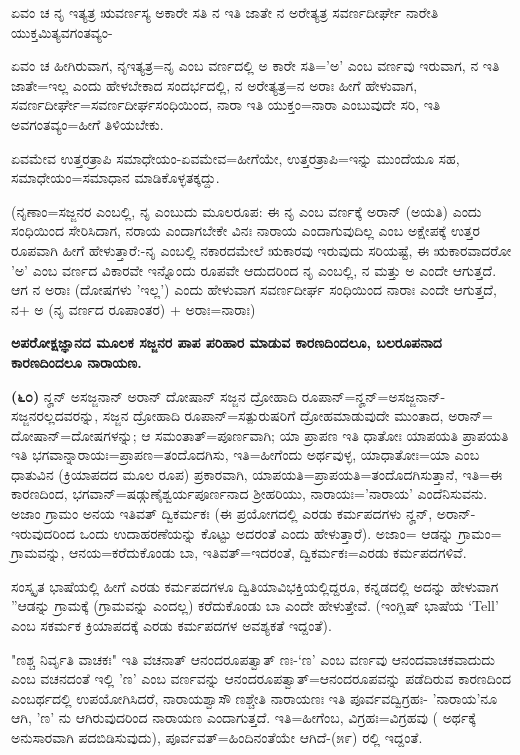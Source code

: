 ಏವಂ ಚ ನೃ ಇತ್ಯತ್ರ ಋವರ್ಣಸ್ಯ ಅಕಾರೇ ಸತಿ ನ ಇತಿ ಜಾತೇ ನ ಅರೇತ್ಯತ್ರ ಸವರ್ಣದೀರ್ಘೇ ನಾರೇತಿ ಯುಕ್ತಮಿತ್ಯವಗಂತವ್ಯಂ-

\newpage

ಏವಂ ಚ ಹೀಗಿರುವಾಗ, ನೃಇತ್ಯತ್ರ=ನೃ ಎಂಬ ವರ್ಣದಲ್ಲಿ ಅ ಕಾರೇ ಸತಿ='ಅ' ಎಂಬ ವರ್ಣವು ಇರುವಾಗ, ನ ಇತಿ ಜಾತೇ=ಇಲ್ಲ ಎಂದು ಹೇಳಬೇಕಾದ ಸಂದರ್ಭದಲ್ಲಿ, ನ ಅರೇತ್ಯತ್ರ=ನ ಅರಾಃ ಹೀಗೆ ಹೇಳುವಾಗ, ಸವರ್ಣದೀರ್ಘೇ=ಸವರ್ಣದೀರ್ಘಸಂಧಿಯಿಂದ, ನಾರಾ ಇತಿ ಯುಕ್ತಂ=ನಾರಾ ಎಂಬುವುದೇ ಸರಿ, ಇತಿ ಅವಗಂತವ್ಯಂ=ಹೀಗೆ ತಿಳಿಯಬೇಕು.

ಏವಮೇವ ಉತ್ತರತ್ರಾಪಿ ಸಮಾಧೇಯಂ-ಏವಮೇವ=ಹೀಗೆಯೇ, ಉತ್ತರತ್ರಾಪಿ=ಇನ್ನು ಮುಂದೆಯೂ ಸಹ, ಸಮಾಧೇಯಂ=ಸಮಾಧಾನ ಮಾಡಿಕೊಳ್ಳತಕ್ಕದ್ದು.

(ನೃಣಾಂ=ಸಜ್ಜನರ ಎಂಬಲ್ಲಿ, ನೃ ಎಂಬುದು ಮೂಲರೂಪ: ಈ ನೃ ಎಂಬ ವರ್ಣಕ್ಕೆ ಅರಾನ್ (ಅಯತಿ) ಎಂದು ಸಂಧಿಯಿಂದ ಸೇರಿಸಿದಾಗ, ನರಾಯ ಎಂದಾಗಬೇಕೇ ವಿನಃ ನಾರಾಯ ಎಂದಾಗುವುದಿಲ್ಲ ಎಂಬ ಅಕ್ಷೇಪಕ್ಕೆ ಉತ್ತರ ರೂಪವಾಗಿ ಹೀಗೆ ಹೇಳುತ್ತಾರೆ:-ನೃ ಎಂಬಲ್ಲಿ ನಕಾರದಮೇಲೆ ಋಕಾರವು ಇರುವುದು ಸರಿಯಷ್ಟೆ, ಈ ಋಕಾರವಾದರೋ 'ಅ' ಎಂಬ ವರ್ಣದ ವಿಕಾರವೇ ಇನ್ನೊಂದು ರೂಪವೇ ಆದುದರಿಂದ ನೃ ಎಂಬಲ್ಲಿ, ನ ಮತ್ತು ಅ ಎಂದೇ ಆಗುತ್ತದೆ. ಆಗ ನ ಅರಾಃ (ದೋಷಗಳು 'ಇಲ್ಲ') ಎಂದು ಹೇಳುವಾಗ ಸವರ್ಣದೀರ್ಘ ಸಂಧಿಯಿಂದ ನಾರಾಃ ಎಂದೇ ಆಗುತ್ತದೆ, ನ+ ಅ (ನೃ ವರ್ಣದ ರೂಪಾಂತರ) + ಅರಾಃ=ನಾರಾಃ)

\begin{center}
\textbf{ಅಪರೋಕ್ಷಜ್ಞಾನದ ಮೂಲಕ ಸಜ್ಜನರ ಪಾಪ ಪರಿಹಾರ ಮಾಡುವ ಕಾರಣದಿಂದಲೂ, ಬಲರೂಪನಾದ ಕಾರಣದಿಂದಲೂ ನಾರಾಯಣ.}
\end{center}

\textbf{(೬೦)} ನೄನ್ ಅಸಜ್ಜನಾನ್ ಅರಾನ್ ದೋಷಾನ್ ಸಜ್ಜನ ದ್ರೋಹಾದಿ ರೂಪಾನ್=ನೄನ್=\-ಅಸಜ್ಜನಾನ್-ಸಜ್ಜನರಲ್ಲದವರನ್ನು, ಸಜ್ಜನ ದ್ರೋಹಾದಿ ರೂಪಾನ್=ಸತ್ಪುರುಷರಿಗೆ ದ್ರೋಹಮಾಡುವುದೇ ಮುಂತಾದ, ಅರಾನ್= ದೋಷಾನ್=ದೋಷಗಳನ್ನು; ಆ ಸಮಂತಾತ್=\-ಪೂರ್ಣವಾಗಿ; ಯಾ ಪ್ರಾಪಣ ಇತಿ ಧಾತೋಃ ಯಾಪಯತಿ ಪ್ರಾಪಯತಿ ಇತಿ ಭಗವಾನ್\break ನಾರಾಯಃ=ಪ್ರಾಪಣ=ತಂದೊದಗಿಸು, ಇತಿ=ಹೀಗೆಂದು ಅರ್ಥವುಳ್ಳ, ಯಾಧಾತೋಃ=ಯಾ ಎಂಬ ಧಾತುವಿನ (ಕ್ರಿಯಾಪದದ ಮೂಲ ರೂಪ) ಪ್ರಕಾರವಾಗಿ, ಯಾಪಯತಿ=ಪ್ರಾಪಯತಿ=\-ತಂದೊದಗಿಸುತ್ತಾನೆ, ಇತಿ=ಈ ಕಾರಣದಿಂದ, ಭಗವಾನ್=ಷಡ್ಗುಣೈಶ್ವರ್ಯಪೂರ್ಣನಾದ ಶ‍್ರೀಹರಿಯು, ನಾರಾಯಃ='ನಾರಾಯ' ಎಂದೆನಿಸುವನು. ಅಜಾಂ ಗ್ರಾಮಂ ಅನಯ ಇತಿವತ್ ದ್ವಿಕರ್ಮಕಃ (ಈ ಪ್ರಯೋಗದಲ್ಲಿ ಎರಡು ಕರ್ಮಪದಗಳು ನೄನ್, ಅರಾನ್-ಇರುವುದರಿಂದ ಒಂದು ಉದಾಹರಣೆಯನ್ನು ಕೊಟ್ಟು ಅದರಂತೆ ಎಂದು ಹೇಳುತ್ತಾರೆ). ಅಜಾಂ= ಆಡನ್ನು ಗ್ರಾಮಂ= ಗ್ರಾಮವನ್ನು, ಆನಯ=ಕರೆದುಕೊಂಡು ಬಾ, ಇತಿವತ್=ಇದರಂತೆ, ದ್ವಿಕರ್ಮಕಃ=ಎರಡು ಕರ್ಮಪದಗಳಿವೆ.

ಸಂಸ್ಕೃತ ಭಾಷೆಯಲ್ಲಿ ಹೀಗೆ ಎರಡು ಕರ್ಮಪದಗಳೂ ದ್ವಿತಿಯಾವಿಭಕ್ತಿಯಲ್ಲಿದ್ದರೂ, ಕನ್ನಡದಲ್ಲಿ ಅದನ್ನು ಹೇಳುವಾಗ ''ಆಡನ್ನು ಗ್ರಾಮಕ್ಕೆ (ಗ್ರಾಮವನ್ನು ಎಂದಲ್ಲ) ಕರೆದುಕೊಂಡು ಬಾ ಎಂದೇ ಹೇಳುತ್ತೇವೆ. (ಇಂಗ್ಲಿಷ್ ಭಾಷೆಯ `Tell' ಎಂಬ ಸಕರ್ಮಕ ಕ್ರಿಯಾಪದಕ್ಕೆ ಎರಡು ಕರ್ಮಪದಗಳ ಅವಶ್ಯಕತೆ ಇದ್ದಂತೆ).

"ಣಶ್ಚ ನಿರ್ವೃತಿ ವಾಚಕಃ" ಇತಿ ವಚನಾತ್ ಆನಂದರೂಪತ್ವಾತ್ ಣಃ-`ಣ' ಎಂಬ ವರ್ಣವು ಆನಂದವಾಚಕವಾದುದು ಎಂಬ ವಚನದಂತೆ ಇಲ್ಲಿ 'ಣ' ಎಂಬ ವರ್ಣವನ್ನು ಆನಂದರೂಪತ್ವಾತ್=ಆನಂದರೂಪವನ್ನು ಪಡೆದಿರುವ ಕಾರಣದಿಂದ ಎಂಬರ್ಥದಲ್ಲಿ ಉಪಯೋಗಿಸಿದರೆ, ನಾರಾಯಶ್ವಾಸೌ ಣಶ್ಚೇತಿ ನಾರಾಯಣಃ ಇತಿ ಪೂರ್ವವದ್ವಿಗ್ರಹಃ- 'ನಾರಾಯ'ನೂ ಆಗಿ, 'ಣ' ನು ಆಗಿರುವುದರಿಂದ ನಾರಾಯಣ ಎಂದಾಗುತ್ತದೆ. ಇತಿ=ಹೀಗೆಂಬ, ವಿಗ್ರಹಃ\-=ವಿಗ್ರಹವು ( ಅರ್ಥಕ್ಕೆ ಅನುಸಾರವಾಗಿ ಪದಬಿಡಿಸುವುದು), ಪೂರ್ವವತ್=ಹಿಂದಿನಂತೆಯೇ ಆಗಿದೆ-(೫೯) ರಲ್ಲಿ ಇದ್ದಂತೆ.

